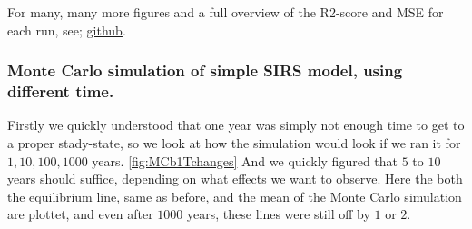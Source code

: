 	For many, many more figures and a full overview of the R2-score and MSE for each run, see; \href{https://github.com/sondrt/FYS-STK4155/tree/master/Project3/TEX/result}{github}.
 





\subsubsection{Monte Carlo simulation of simple SIRS model, using different time.}
	Firstly we quickly understood that one year was simply not enough time to get to a proper stady-state, so we look at how the simulation would look if we ran it for $1,10,100,1000$ years. \ref{fig:MCb1Tchanges} And we quickly figured that $5$ to $10$ years should suffice, depending on what effects we want to observe. Here the both the equilibrium line, same as before, and the mean of the Monte Carlo simulation are plottet, and even after $1000$ years, these lines were still off by $1$ or $2$. 

